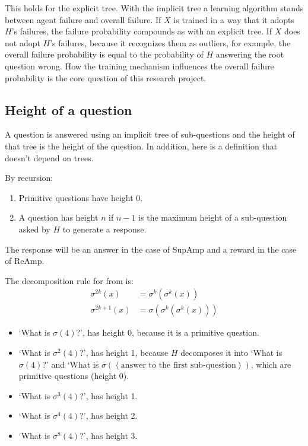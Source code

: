 \documentclass{farlamp}
\begin{document}
This holds for the explicit tree. With the implicit tree a learning algorithm
stands between agent failure and overall failure. If $X$ is trained in a way
that it adopts $H$'s failures, the failure probability compounds as with an
explicit tree. If $X$ does not adopt $H$'s failures, because it recognizes them
as outliers, for example, the overall failure probability is equal to the
probability of $H$ answering the root question wrong.
How the training mechanism influences the overall failure probability is the
core question of this research project.


\subsection{Height of a question}

A question is answered using an implicit tree of sub-questions and the height of
that tree is the height of the question. In addition, here is a definition that
doesn't depend on trees.

\begin{definition} By recursion:
    \begin{enumerate}
    \item Primitive questions have height 0.
    \item A question has height $n$ if $n-1$ is the maximum height of a
        sub-question asked by $H$ to generate a response.
    \end{enumerate}
The response will be an answer in the case of SupAmp and a reward in the case of
ReAmp.
\end{definition}

\begin{example}
    The decomposition rule for  from \textcite[table
    3]{CSASupAmp} is:
    \begin{align}
        \sigma^{2k}(x) &= \sigma^k(\sigma^k(x)) \\
        \sigma^{2k+1}(x) &= \sigma(\sigma^k(\sigma^k(x)))
    \end{align}

    \begin{itemize}
        \item ‘What is $\sigma(4)$?’, has height 0, because it is a primitive
            question.
        \item ‘What is $\sigma^2(4)$?’, has height 1, because $H$ decomposes it
            into ‘What is $\sigma(4)$?’ and ‘What is $\sigma(\left<\text{answer
            to the first sub-question}\right>)$, which are primitive questions
            (height 0).
        \item ‘What is $\sigma^3(4)$?’, has height 1.
        \item ‘What is $\sigma^4(4)$?’, has height 2.
        \item ‘What is $\sigma^8(4)$?’, has height 3.
    \end{itemize}
\end{example}
\end{document}
